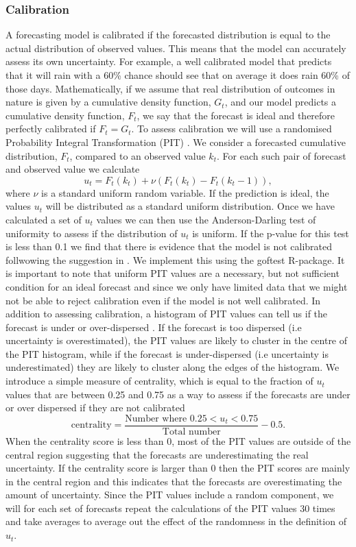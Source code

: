\documentclass[12pt]{article}
\begin{document}
\subsubsection{Calibration}
A forecasting model is calibrated if the forecasted distribution is equal to the actual distribution of observed values. This means that the model can accurately assess its own uncertainty. For example, a well calibrated model that predicts that it will rain with a 60\% chance should see that on average it does rain 60\% of those days. Mathematically, if we assume that real distribution of outcomes in nature is given by a cumulative density function, $G_t$, and our model predicts a cumulative density function, $F_t$, we say that the forecast is ideal and therefore perfectly calibrated if $F_t=G_t$. To assess calibration we will use a randomised Probability Integral Transformation (PIT) \cite{czadoPredictiveModelAssessment2009a}. We consider a forecasted cumulative distribution, $F_t$, compared to an observed value $k_t$. For each such pair of forecast and observed value we calculate
\[ u_t = F_t(k_t) + \nu (F_t(k_t) - F_t(k_t -1)),\]
where $\nu$ is a standard uniform random variable. If the prediction is ideal, the values $u_t$ will be distributed as a standard uniform distribution. Once we have calculated a set of $u_t$ values we can then use the Anderson-Darling test of uniformity to assess if the distribution of $u_t$ is uniform. If the p-value for this test is less than 0.1 we find that there is evidence that the model is not calibrated follwowing the suggestion in \cite{funkAssessingPerformanceRealtime2019}. We implement this using the goftest \cite{farawayGoftestClassicalGoodnessofFit2017} R-package. It is important to note that uniform PIT values are a necessary, but not sufficient condition for an ideal forecast and since we only have limited data that we might not be able to reject calibration even if the model is not well calibrated. In addition to assessing calibration, a histogram of PIT values can tell us if the forecast is under or over-dispersed \cite{czadoPredictiveModelAssessment2009a}. If the forecast is too dispersed (i.e uncertainty is overestimated), the PIT values are likely to cluster in the centre of the PIT histogram, while if the forecast is under-dispersed (i.e uncertainty is underestimated) they are likely to cluster along the edges of the histogram. We introduce a simple measure of centrality, which is equal to the fraction of $u_t$ values that are between 0.25 and 0.75 as a way to assess if the forecasts are under or over dispersed if they are not calibrated
\[\text{centrality} = \frac{\text{Number where }0.25 < u_t < 0.75}{\text{Total number}} - 0.5.\]
When the centrality score is less than 0, most of the PIT values are outside of the central region suggesting that the forecasts are underestimating the real uncertainty.  If the centrality score is larger than 0 then the PIT scores are mainly in the central region and this indicates that the forecasts are overestimating the amount of uncertainty. Since the PIT values include a random component, we will for each set of forecasts repeat the calculations of the PIT values 30 times and take averages to average out the effect of the randomness in the definition of $u_t$.
\end{document}
